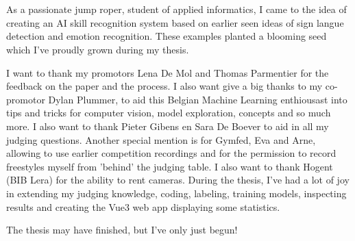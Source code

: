 
\chapter*{}%
\label{ch:voorwoord}


As a passionate jump roper, student of applied informatics, I came to the idea of creating an AI skill recognition system based on earlier seen ideas of sign langue detection and emotion recognition. These examples planted a blooming seed which I've proudly grown during my thesis.

I want to thank my promotors Lena De Mol and Thomas Parmentier for the feedback on the paper and the process.
I also want give a big thanks to my co-promotor Dylan Plummer, to aid this Belgian Machine Learning enthiousast into tips and tricks for computer vision, model exploration, concepts and so much more.
I also want to thank Pieter Gibens en Sara De Boever to aid in all my judging questions.
Another special mention is for Gymfed, Eva and Arne, allowing to use earlier competition recordings and for the permission to record freestyles myself from 'behind' the judging table.
I also want to thank Hogent (BIB Lera) for the ability to rent cameras.
During the thesis, I've had a lot of joy in extending my judging knowledge, coding, labeling, training models, inspecting results and creating the Vue3 web app displaying some statistics.

The thesis may have finished, but I've only just begun!